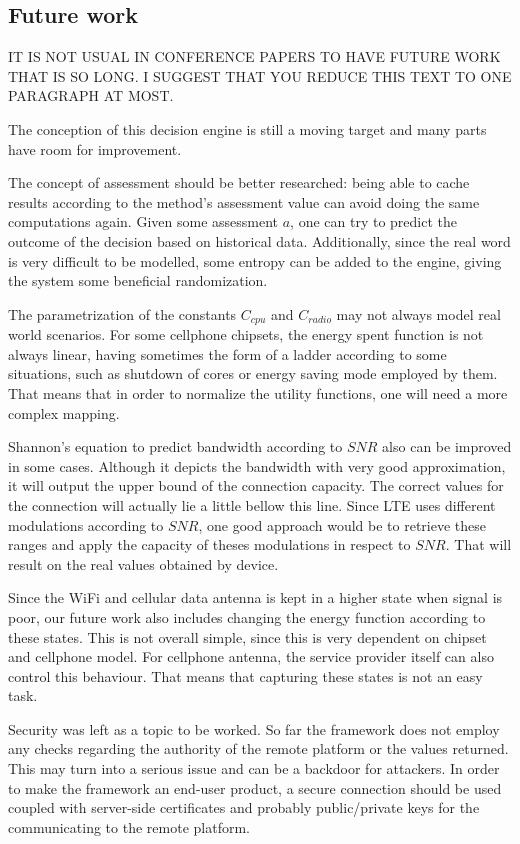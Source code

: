 \documentclass[10pt, conference, letterpaper]{IEEEtran}
\begin{document}
{\color{red}
\subsection{Future work}

IT IS NOT USUAL IN CONFERENCE PAPERS TO HAVE FUTURE WORK THAT IS SO LONG. I SUGGEST THAT YOU REDUCE THIS TEXT TO ONE PARAGRAPH AT MOST.

  The conception of this decision engine is still a moving target and many parts have room for improvement.

  The concept of assessment should be better researched: being able to cache results according to the method's assessment value can avoid doing the same computations again. Given some assessment $a$, one can try to predict the outcome of the decision based on historical data. Additionally, since the real word is very difficult to be modelled, some entropy can be added to the engine, giving the system some beneficial randomization.

  The parametrization of the constants $C_{cpu}$ and $C_{radio}$ may not always model real world scenarios. For some cellphone chipsets, the energy spent function is not always linear, having sometimes the form of a ladder according to some situations, such as shutdown of cores or energy saving mode employed by them. That means that in order to normalize the utility functions, one will need a more complex mapping.

  Shannon's equation to predict bandwidth according to $SNR$ also can be improved in some cases. Although it depicts the bandwidth with very good approximation, it will output the upper bound of the connection capacity. The correct values for the connection will actually lie a little bellow this line. Since LTE uses different modulations according to $SNR$, one good approach would be to retrieve these ranges and apply the capacity of theses modulations in respect to $SNR$. That will result on the real values obtained by device.

  Since the WiFi and cellular data antenna is kept in a higher state when signal is poor, our future work also includes changing the energy function according to these states. This is not overall simple, since this is very dependent on chipset and cellphone model. For cellphone antenna, the service provider itself can also control this behaviour. That means that capturing these states is not an easy task.

  Security was left as a topic to be worked. So far the framework does not employ any checks regarding the authority of the remote platform or the values returned. This may turn into a serious issue and can be a backdoor for attackers. In order to make the framework an end-user product, a secure connection should be used coupled with server-side certificates and probably public/private keys for the communicating to the remote platform.}



\end{document}
